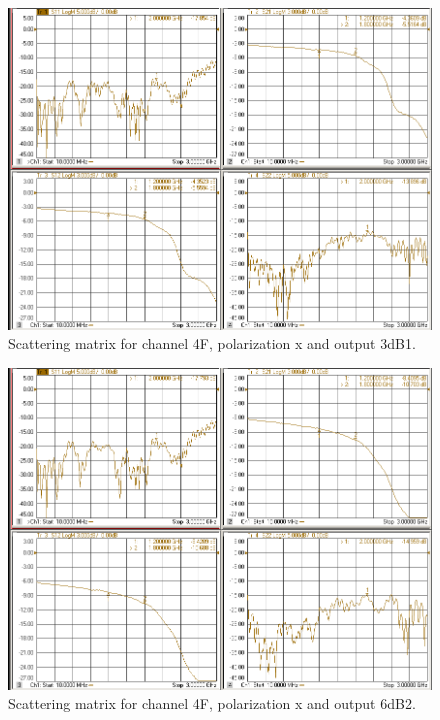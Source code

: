 \documentclass[12pt,a4paper,oneside]{article}
\begin{document}
\begin{figure}[H]
\centering
\includegraphics[width=0.9\linewidth]{VNA_results/4Fx_3dB1.png}
\caption{Scattering matrix for channel 4F, polarization x and output 3dB1.}
\label{fig:4Fx_3dB1}
\end{figure}


\begin{figure}[H]
\centering
\includegraphics[width=0.9\linewidth]{VNA_results/4Fx_6dB2.png}
\caption{Scattering matrix for channel 4F, polarization x and output 6dB2.}
\label{fig:4Fx_6dB2}
\end{figure}
\end{document}
